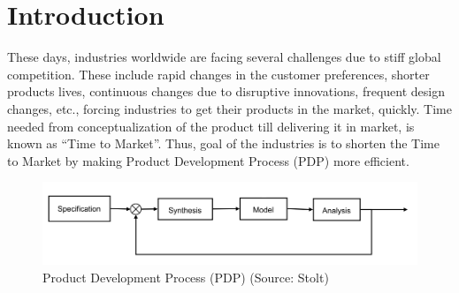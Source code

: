 

\section{Introduction}


These days, industries worldwide are facing several challenges due to stiff global competition. These include rapid changes in the customer preferences, shorter products lives, continuous changes due to disruptive innovations, frequent design changes, etc., forcing industries to get their products in the market, quickly. Time needed from conceptualization of the product till delivering it in market, is known as ``Time to Market''. Thus, goal of the industries is to shorten the Time to Market by making Product Development Process (PDP) more efficient. 

	\bigskip
	
	\begin{figure} [!h]
		\centering
		\includegraphics[width=0.9\linewidth]{..//Common/images/PDPProcess.png}
		\caption{Product Development Process (PDP) (Source: Stolt\cite{Stolt2008})}
		\label{fig:introduction:PDPProcess}
	\end{figure}
	
